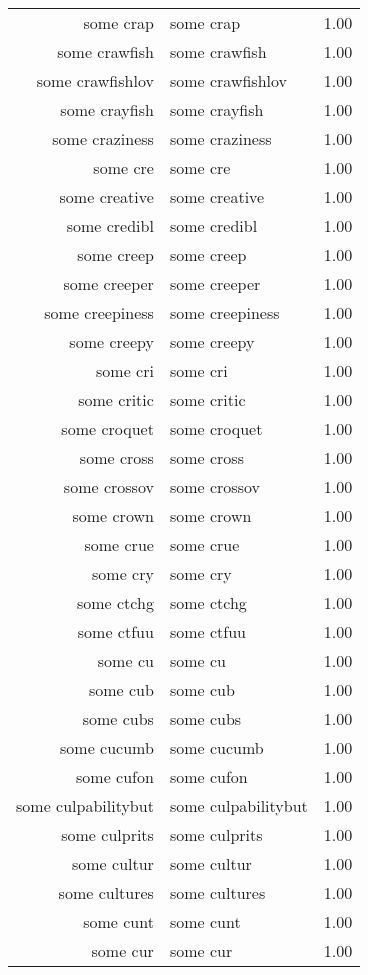 \begin{table}[ht]
\begin{tabular}{rlr}
  some crap & some crap & 1.00 \\ 
  some crawfish & some crawfish & 1.00 \\ 
  some crawfishlov & some crawfishlov & 1.00 \\ 
  some crayfish & some crayfish & 1.00 \\ 
  some craziness & some craziness & 1.00 \\ 
  some cre & some cre & 1.00 \\ 
  some creative & some creative & 1.00 \\ 
  some credibl & some credibl & 1.00 \\ 
  some creep & some creep & 1.00 \\ 
  some creeper & some creeper & 1.00 \\ 
  some creepiness & some creepiness & 1.00 \\ 
  some creepy & some creepy & 1.00 \\ 
  some cri & some cri & 1.00 \\ 
  some critic & some critic & 1.00 \\ 
  some croquet & some croquet & 1.00 \\ 
  some cross & some cross & 1.00 \\ 
  some crossov & some crossov & 1.00 \\ 
  some crown & some crown & 1.00 \\ 
  some crue & some crue & 1.00 \\ 
  some cry & some cry & 1.00 \\ 
  some ctchg & some ctchg & 1.00 \\ 
  some ctfuu & some ctfuu & 1.00 \\ 
  some cu & some cu & 1.00 \\ 
  some cub & some cub & 1.00 \\ 
  some cubs & some cubs & 1.00 \\ 
  some cucumb & some cucumb & 1.00 \\ 
  some cufon & some cufon & 1.00 \\ 
  some culpabilitybut & some culpabilitybut & 1.00 \\ 
  some culprits & some culprits & 1.00 \\ 
  some cultur & some cultur & 1.00 \\ 
  some cultures & some cultures & 1.00 \\ 
  some cunt & some cunt & 1.00 \\ 
  some cur & some cur & 1.00 \\ 

\end{tabular}
\end{table}
